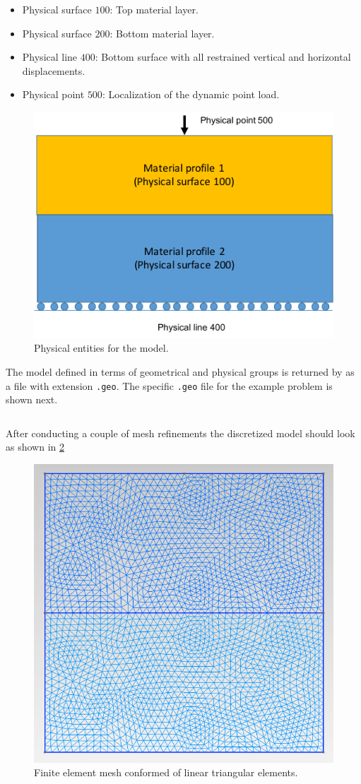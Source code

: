 \documentclass[11pt,letterpaper]{article}
\begin{document}
\begin{itemize}
\item Physical surface $100$: Top material layer.
\item Physical surface $200$: Bottom material layer.
\item Physical line $400$: Bottom surface with all restrained vertical and horizontal displacements.
\item Physical point $500$: Localization of the dynamic point load.
\end{itemize}

\begin{figure}[h]
  \centering
  \includegraphics[width=8 cm]{img/physical.pdf}
  \caption{Physical entities for the model.}
  \label{fig:physical}
\end{figure}

The model defined in terms of geometrical and physical groups is returned by {\Gmsh} as a file with extension \texttt{.geo}. The specific \texttt{.geo} file for the example problem is shown next.

\inputminted[mathescape,
               numbersep=5pt,
               gobble=0,
               frame=lines,
               framesep=2mm]{c}{bimaterial.geo}
               
After conducting a couple of mesh refinements the discretized model should look as shown in \cref{fig:mesh}

\begin{figure}[H]
  \centering
  \includegraphics[width=8 cm]{img/mesh.pdf}
  \caption{Finite element mesh conformed of linear triangular elements.}
  \label{fig:mesh}
\end{figure} 
\end{document}
